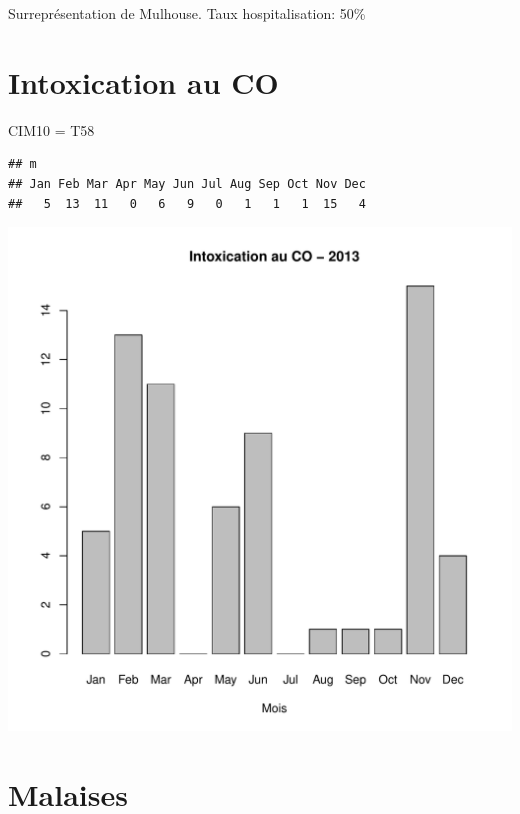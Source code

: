 \documentclass[12pt,english,french,twoside]{book}\usepackage[]{graphicx}\usepackage[]{color}
\makeatletter
\def\maxwidth{ %
  \ifdim\Gin@nat@width>\linewidth
    \linewidth
  \else
    \Gin@nat@width
  \fi
}
\newenvironment{kframe}{%
 \def\at@end@of@kframe{}%
 \ifinner\ifhmode%
  \def\at@end@of@kframe{\end{minipage}}%
  \begin{minipage}{\columnwidth}%
 \fi\fi%
 \def\FrameCommand##1{\hskip\@totalleftmargin \hskip-\fboxsep
 \colorbox{shadecolor}{##1}\hskip-\fboxsep
     \hskip-\linewidth \hskip-\@totalleftmargin \hskip\columnwidth}%
 \MakeFramed {\advance\hsize-\width
   \@totalleftmargin\z@ \linewidth\hsize
   \@setminipage}}%
 {\par\unskip\endMakeFramed%
 \at@end@of@kframe}
\newenvironment{knitrout}{}{} %
\makeatother
\begin{document}
Surreprésentation de Mulhouse. 
Taux hospitalisation: 50\%


\section{Intoxication au CO}

CIM10 = T58

\begin{knitrout}
\color{fgcolor}\begin{kframe}
\begin{verbatim}
## m
## Jan Feb Mar Apr May Jun Jul Aug Sep Oct Nov Dec 
##   5  13  11   0   6   9   0   1   1   1  15   4
\end{verbatim}
\end{kframe}
\includegraphics[width=\maxwidth]{figure/co} 

\end{knitrout}



\section{Malaises}
\end{document}
